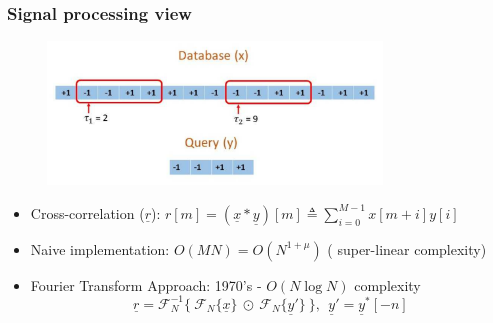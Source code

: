 \documentclass[10pt,xcolor=table]{beamer}
\newcommand{\defeq}{\triangleq}
\newcommand{\xv}{\underline{x}}
\newcommand{\yv}{\underline{y}}
\newcommand{\rv}{\underline{r}}
\begin{document}
\begin{frame}\frametitle{Signal processing view}

	\begin{figure}[t]
		\centering
		\includegraphics[width=3.5in]{Pattern_matching_ex.pdf}
	\end{figure}

			\begin{block}{}			
				\begin{itemize}
					\item {Cross-correlation} ($\rv$): $\displaystyle{r[m]=(\xv*\yv)[m] \defeq \sum_{i=0}^{M-1} x[m+i] y[i] }$
			        \pause
					\item {Naive implementation}: $O(MN) = O(N^{1+\mu})$ ({\color{blue} super-linear} complexity)
                    \pause
					\item {Fourier Transform Approach}: 1970's - $O(N \log N)$ complexity
					\begin{equation}\nonumber
					\rv = \mathcal{F}_{N}^{-1} \{~  \mathcal{F}_{N}\{\xv\} ~ \odot ~  \mathcal{F}_{N}\{\yv'\} ~ \}, \ \ \yv' = \yv^{*}[-n]
					\end{equation}
					
				\end{itemize}
			\end{block}												
\end{frame}
\end{document}
